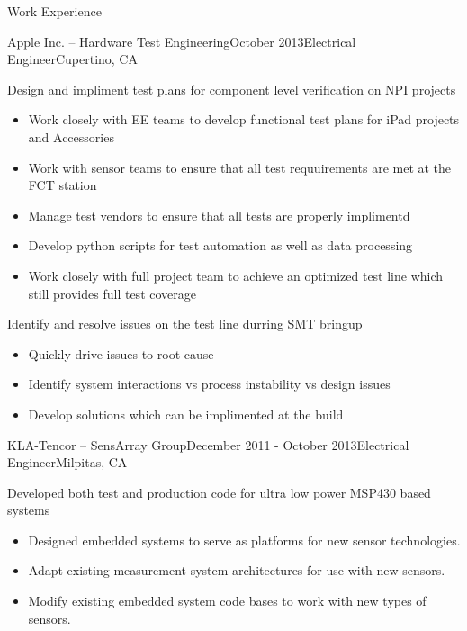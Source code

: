 \documentclass{resume} %
\begin{document}
\begin{rSection}{Work Experience}

\begin{rSubsection}{Apple Inc. -- Hardware Test Engineering}{October 2013}{Electrical Engineer}{Cupertino, CA}
\smallskip

\item Design and impliment test plans for component level verification on NPI projects
\begin{itemize}
\itemsep -0.5em \vspace{-0.5em}
\renewcommand{\labelitemi}{-}
\item Work closely with EE teams to develop functional test plans for iPad projects and Accessories
\item Work with sensor teams to ensure that all test requuirements are met at the FCT station
\item Manage test vendors to ensure that all tests are properly implimentd 
\item Develop python scripts for test automation as well as data processing
\item Work closely with full project team to achieve an optimized test line which still provides full test coverage 
\end{itemize}
\medskip

\item Identify and resolve issues on the test line durring SMT bringup
\begin{itemize}
\itemsep -0.5em \vspace{-0.5em}
\renewcommand{\labelitemi}{-}
\item Quickly drive issues to root cause
\item Identify system interactions vs process instability vs design issues
\item Develop solutions which can be implimented at the build
\end{itemize}
\end{rSubsection}

\begin{rSubsection}{KLA-Tencor -- SensArray Group}{December 2011 - October 2013}{Electrical Engineer}{Milpitas, CA}
\smallskip

\item Developed both test and production code for ultra low power MSP430 based systems
\begin{itemize}
\itemsep -0.5em \vspace{-0.5em}
\renewcommand{\labelitemi}{-}
\item Designed embedded systems to serve as platforms for new sensor technologies.
\item Adapt existing measurement system architectures for use with new sensors.
\item Modify existing embedded system code bases to work with new types of sensors.
\end{itemize}
\medskip


\end{rSubsection}
\end{rSection}
\end{document}
